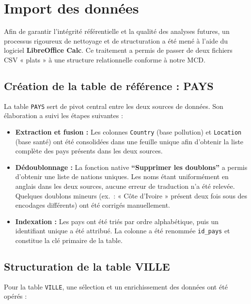 \documentclass[mstat,12pt]{unswthesis}
\begin{document}
\section{Import des données}\label{import-des-donnuxe9es}

Afin de garantir l'intégrité référentielle et la qualité des analyses
futures, un processus rigoureux de nettoyage et de structuration a été
mené à l'aide du logiciel \textbf{LibreOffice Calc}. Ce traitement a
permis de passer de deux fichiers CSV « plats » à une structure
relationnelle conforme à notre MCD.

\subsection{Création de la table de référence :
PAYS}\label{cruxe9ation-de-la-table-de-ruxe9fuxe9rence-pays}

La table \texttt{PAYS} sert de pivot central entre les deux sources de
données. Son élaboration a suivi les étapes suivantes :

\medskip

\begin{itemize}
  \item \textbf{Extraction et fusion :} Les colonnes \texttt{Country} (base pollution) et \texttt{Location} (base santé) ont été consolidées dans une feuille unique afin d'obtenir la liste complète des pays présents dans les deux sources.
  \item \textbf{Dédoublonnage :} La fonction native \textbf{``Supprimer les doublons''} a permis d'obtenir une liste de nations uniques. Les noms étant uniformément en anglais dans les deux sources, aucune erreur de traduction n'a été relevée. Quelques doublons mineurs (ex.\ : « Côte d'Ivoire » présent deux fois sous des encodages différents) ont été corrigés manuellement.
  \item \textbf{Indexation :} Les pays ont été triés par ordre alphabétique, puis un identifiant unique a été attribué. La colonne a été renommée \texttt{id\_pays} et constitue la clé primaire de la table.
\end{itemize}

\subsection{Structuration de la table
VILLE}\label{structuration-de-la-table-ville}

Pour la table \texttt{VILLE}, une sélection et un enrichissement des
données ont été opérés :
\end{document}
